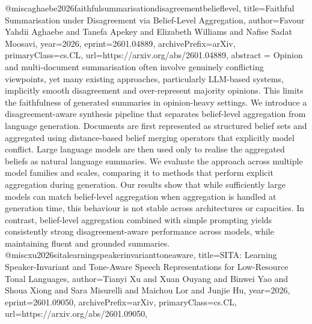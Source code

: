 {}@misc{aghaebe2026faithfulsummarisationdisagreementbelieflevel,
      title={Faithful Summarisation under Disagreement via Belief-Level Aggregation}, 
      author={Favour Yahdii Aghaebe and Tanefa Apekey and Elizabeth Williams and Nafise Sadat Moosavi},
      year={2026},
      eprint={2601.04889},
      archivePrefix={arXiv},
      primaryClass={cs.CL},
      url={https://arxiv.org/abs/2601.04889},
      abstract = {Opinion and multi-document summarisation often involve genuinely conflicting viewpoints, yet many existing approaches, particularly LLM-based systems, implicitly smooth disagreement and over-represent majority opinions. This limits the faithfulness of generated summaries in opinion-heavy settings. We introduce a disagreement-aware synthesis pipeline that separates belief-level aggregation from language generation. Documents are first represented as structured belief sets and aggregated using distance-based belief merging operators that explicitly model conflict. Large language models are then used only to realise the aggregated beliefs as natural language summaries. We evaluate the approach across multiple model families and scales, comparing it to methods that perform explicit aggregation during generation. Our results show that while sufficiently large models can match belief-level aggregation when aggregation is handled at generation time, this behaviour is not stable across architectures or capacities. In contrast, belief-level aggregation combined with simple prompting yields consistently strong disagreement-aware performance across models, while maintaining fluent and grounded summaries.}
}@misc{xu2026sitalearningspeakerinvarianttoneaware,
      title={SITA: Learning Speaker-Invariant and Tone-Aware Speech Representations for Low-Resource Tonal Languages}, 
      author={Tianyi Xu and Xuan Ouyang and Binwei Yao and Shoua Xiong and Sara Misurelli and Maichou Lor and Junjie Hu},
      year={2026},
      eprint={2601.09050},
      archivePrefix={arXiv},
      primaryClass={cs.CL},
      url={https://arxiv.org/abs/2601.09050},
}
